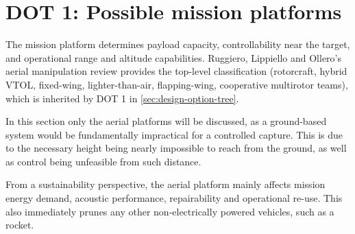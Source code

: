 

\vspace{-10pt}
\section{DOT 1: Possible mission platforms}
\label{sec:dot_platform}

The mission platform determines payload capacity,  controllability near the target, and operational range and altitude capabilities. Ruggiero, Lippiello and Ollero's aerial manipulation review \cite{Ruggiero2018AerialReview} provides the top-level classification (rotorcraft, hybrid VTOL, fixed-wing, lighter-than-air, flapping-wing, cooperative multirotor teams), which is inherited by DOT 1 in \autoref{sec:design-option-tree}.

In this section only the aerial platforms will be discussed, as a ground-based system would be fundamentally impractical for a controlled capture. This is due to the necessary height being nearly impossible to reach from the ground, as well as control being unfeasible from such distance. 

From a sustainability perspective, the aerial platform mainly affects mission energy demand, acoustic performance, repairability and operational re-use. This also immediately prunes any other non-electrically powered vehicles, such as a rocket.
\vspace{-10pt}
